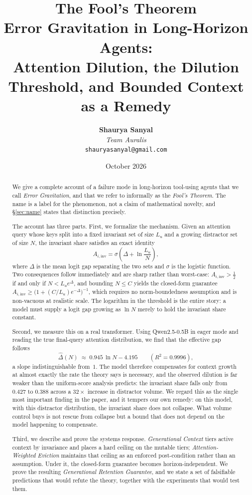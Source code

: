 \documentclass[11pt,a4paper]{article}
\title{%
  \textbf{The Fool's Theorem}\\[0.4em]
  \large Error Gravitation in Long-Horizon Agents:\\
  Attention Dilution, the Dilution Threshold, and Bounded Context as a Remedy
}
\author{%
  \textbf{Shaurya Sanyal}\\
  \textit{Team Auralis}\\
  \texttt{shauryasanyal@gmail.com}
}
\date{October 2026}
\theoremstyle{plain}
\theoremstyle{definition}
\theoremstyle{remark}
\newcommand{\Ainv}{A_{i,\mathrm{inv}}}
\begin{document}
\maketitle

\begin{abstract}
\noindent
We give a complete account of a failure mode in long-horizon tool-using agents
that we call \emph{Error Gravitation}, and that we refer to informally as the
\emph{Fool's Theorem}. The name is a label for the phenomenon, not a claim of
mathematical novelty, and \S\ref{sec:name} states that distinction precisely.

The account has three parts. First, we formalize the mechanism. Given an
attention query whose keys split into a fixed invariant set of size $L_u$ and a
growing distractor set of size $N$, the invariant share satisfies an exact
identity
\[
  \Ainv = \sigma\!\left(\Delta + \ln \frac{L_u}{N}\right),
\]
where $\Delta$ is the mean logit gap separating the two sets and $\sigma$ is the
logistic function. Two consequences follow immediately and are sharp rather than
worst-case: $\Ainv > \tfrac12$ if and only if $N < L_u e^{\Delta}$, and bounding
$N \le C$ yields the closed-form guarantee
$\Ainv \ge \bigl(1 + (C/L_u)e^{-\Delta}\bigr)^{-1}$, which requires no
norm-boundedness assumption and is non-vacuous at realistic scale. The
logarithm in the threshold is the entire story: a model must supply a logit gap
growing as $\ln N$ merely to hold the invariant share constant.

Second, we measure this on a real transformer. Using Qwen2.5-0.5B in eager mode
and reading the true final-query attention distribution, we find that the
effective gap follows
\[
  \hat{\Delta}(N) \;\approx\; 0.945\,\ln N - 4.195
  \qquad (R^2 = 0.9996),
\]
a slope indistinguishable from~$1$. The model therefore compensates for context
growth at almost exactly the rate the theory says is necessary, and the observed
dilution is far weaker than the uniform-score analysis predicts: the invariant
share falls only from $0.427$ to $0.388$ across a $32\times$ increase in
distractor volume. We regard this as the single most important finding in the
paper, and it tempers our own remedy: on this model, with this distractor
distribution, the invariant share does not collapse. What volume control buys is
not rescue from collapse but a bound that does not depend on the model happening
to compensate.

Third, we describe and prove the systems response. \emph{Generational Context}
tiers active context by invariance and places a hard ceiling on the mutable
tiers; \emph{Attention-Weighted Eviction} maintains that ceiling as an enforced
post-condition rather than an assumption. Under it, the closed-form guarantee
becomes horizon-independent. We prove the resulting \emph{Generational Retention
Guarantee}, and we state a set of falsifiable predictions that would refute the
theory, together with the experiments that would test them.


\end{abstract}
\end{document}

